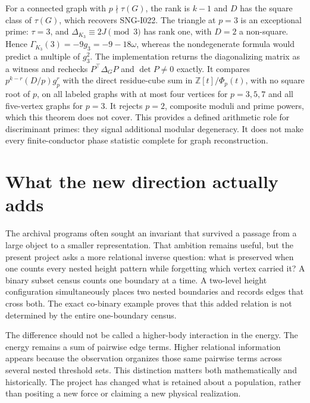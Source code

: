 \documentclass[
  11pt,
  a4paper,
]{report}
\let\singularitytexttt\texttt
\renewcommand{\texttt}[1]{\singularitytexttt{\seqsplit{#1}}}
\begin{document}
For a connected graph with \(p\nmid\tau(G)\), the rank is \(k-1\) and
\(D\) has the square class of \(\tau(G)\), which recovers SNG-I022. The
triangle at \(p=3\) is an exceptional prime: \(\tau=3\), and
\(\Delta_{K_3}\equiv2J\pmod 3\) has rank one, with \(D=2\) a non-square.
Hence \(\Gamma_{K_3}(3)=-9g_3=-9-18\omega\), whereas the nondegenerate
formula would predict a multiple of \(g_3^2\). The implementation
\texttt{src/singularity/gauss.py} returns the diagonalizing matrix as a
witness and rechecks \(P^\top\Delta_GP\) and \(\det P\ne0\) exactly. It
compares \(p^{k-r}(D/p)g_p^r\) with the direct residue-cube sum in
\(\mathbb Z[t]/\Phi_p(t)\), with no square root of \(p\), on all labeled
graphs with at most four vertices for \(p=3,5,7\) and all five-vertex
graphs for \(p=3\). It rejects \(p=2\), composite moduli and prime
powers, which this theorem does not cover. This provides a defined
arithmetic role for discriminant primes: they signal additional modular
degeneracy. It does not make every finite-conductor phase statistic
complete for graph reconstruction.

\hypertarget{what-the-new-direction-actually-adds}{%
\section{What the new direction actually
adds}\label{what-the-new-direction-actually-adds}}

The archival programs often sought an invariant that survived a passage
from a large object to a smaller representation. That ambition remains
useful, but the present project asks a more relational inverse question:
what is preserved when one counts every nested height pattern while
forgetting which vertex carried it? A binary subset census counts one
boundary at a time. A two-level height configuration simultaneously
places two nested boundaries and records edges that cross both. The
exact co-binary example proves that this added relation is not
determined by the entire one-boundary census.

The difference should not be called a higher-body interaction in the
energy. The energy remains a sum of pairwise edge terms. Higher
relational information appears because the observation organizes those
same pairwise terms across several nested threshold sets. This
distinction matters both mathematically and historically. The project
has changed what is retained about a population, rather than positing a
new force or claiming a new physical realization.
\end{document}
